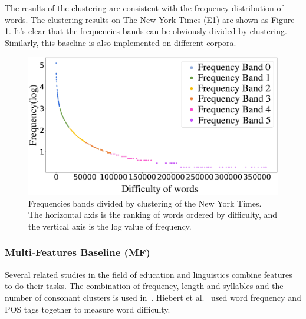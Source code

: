 The results of the clustering are consistent with the frequency distribution of words.
The clustering results on The New York Times (E1) are shown as Figure \ref{fig:cluster}.
It's clear that the frequencies bands can be  obviously divided by clustering.
Similarly, this baseline is also implemented on different corpora.
\begin{figure}[th]
	\centering
	\includegraphics[width=1\linewidth]{pic/cluster.eps} 
	\caption{Frequencies bands divided by clustering of the New York Times. The horizontal axis is the ranking of words ordered by difficulty, and the vertical axis is the log value of frequency.}
	\label{fig:cluster}
\end{figure}



\subsubsection{Multi-Features Baseline (MF)}
Several related studies in the field of education and linguistics combine features to do their tasks. 
The combination of frequency, length and syllables and the number of consonant clusters is used in~\cite{koirala2015word}. 
Hiebert et al.~ used word frequency and POS tags together to measure word difficulty.

